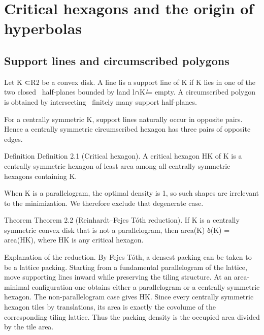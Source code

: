 \chapter{Critical hexagons and the origin of hyperbolas}
\section{Support lines and circumscribed polygons}

\begin{displaytext}
Let K ⊂R2 be a convex disk. A line lis a support line of K if K lies in one of the two closed \
half-planes bounded by land l∩K ̸= empty. A circumscribed polygon is obtained by intersecting \
finitely many support half-planes.
\end{displaytext}

For a centrally symmetric K, support lines naturally occur in opposite pairs. Hence a centrally symmetric circumscribed hexagon has three pairs of opposite edges.


\begin{statementbox}{Definition}
Definition 2.1 (Critical hexagon). A critical hexagon HK of K is a centrally symmetric hexagon of least area among all centrally symmetric hexagons containing K.
\end{statementbox}

When K is a parallelogram, the optimal density is 1, so such shapes are irrelevant to the minimization. We therefore exclude that degenerate case.


\begin{statementbox}{Theorem}
Theorem 2.2 (Reinhardt–Fejes Tóth reduction). If K is a centrally symmetric convex disk that is not a parallelogram, then area(K) δ(K) = area(HK), where HK is any critical hexagon.
\end{statementbox}

Explanation of the reduction. By Fejes Tóth, a densest packing can be taken to be a lattice packing. Starting from a fundamental parallelogram of the lattice, move supporting lines inward while preserving the tiling structure. At an area-minimal configuration one obtains either a parallelogram or a centrally symmetric hexagon. The non-parallelogram case gives HK. Since every centrally symmetric hexagon tiles by translations, its area is exactly the covolume of the corresponding tiling lattice. Thus the packing density is the occupied area divided by the tile area.


